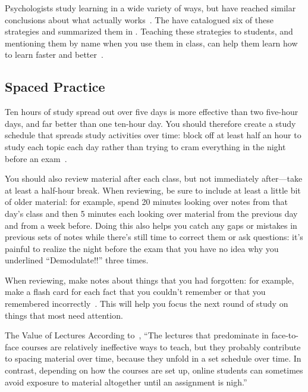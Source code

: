 
Psychologists study learning in a wide variety of ways,
but have reached similar conclusions about what actually works~\cite{Mark2018}.
The 
have catalogued six of these strategies and
summarized them in .
Teaching these strategies to students,
and mentioning them by name when you use them in class,
can help them learn how to learn faster and better~\cite{Wein2018a,Wein2018b}.

\subsection*{Spaced Practice}

Ten hours of study spread out over five days
is more effective than two five-hour days,
and far better than one ten-hour day.
You should therefore create a study schedule that spreads study activities over time:
block off at least half an hour to study each topic each day
rather than trying to cram everything in the night before an exam~\cite{Kang2016}.

You should also review material after each class,
but not immediately after---take at least a half-hour break.
When reviewing,
be sure to include at least a little bit of older material:
for example,
spend 20 minutes looking over notes from that day's class
and then 5 minutes each looking over material from the previous day
and from a week before.
Doing this also helps you catch any gaps or mistakes in previous sets of notes
while there's still time to correct them or ask questions:
it's painful to realize the night before the exam
that you have no idea why you underlined ``Demodulate!!'' three times.

When reviewing,
make notes about things that you had forgotten:
for example,
make a flash card for each fact that you couldn't remember
or that you remembered incorrectly~\cite{Matt2019}.
This will help you focus the next round of study on things that most need attention.

\begin{aside}{The Value of Lectures}
  According to~\cite{Mill2016a},
  ``The lectures that predominate in face-to-face courses are relatively ineffective ways to teach,
  but they probably contribute to spacing material over time,
  because they unfold in a set schedule over time.
  In contrast,
  depending on how the courses are set up,
  online students can sometimes avoid exposure to material altogether until an assignment is nigh.''
\end{aside}

